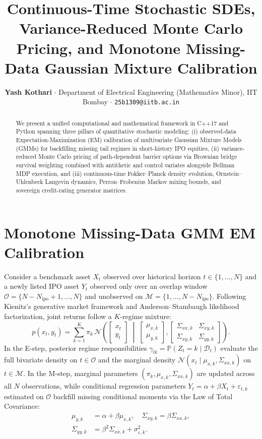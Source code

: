 \documentclass[10pt,twocolumn,a4paper]{article}
\title{\vspace{-1.4em}\large\textbf{Continuous-Time Stochastic SDEs, Variance-Reduced Monte Carlo Pricing, and Monotone Missing-Data Gaussian Mixture Calibration}\vspace{-0.5em}}
\author{\normalsize \textbf{Yash Kothari} $\cdot$ Department of Electrical Engineering (Mathematics Minor), IIT Bombay $\cdot$ \texttt{25b1309@iitb.ac.in}\vspace{-1.0em}}
\date{}
\begin{document}
\maketitle
\thispagestyle{empty}

\begin{abstract}
\noindent We present a unified computational and mathematical framework in C++17 and Python spanning three pillars of quantitative stochastic modeling: (i) observed-data Expectation-Maximization (EM) calibration of multivariate Gaussian Mixture Models (GMMs) for backfilling missing tail regimes in short-history IPO equities, (ii) variance-reduced Monte Carlo pricing of path-dependent barrier options via Brownian bridge survival weighting combined with antithetic and control variates alongside Bellman MDP execution, and (iii) continuous-time Fokker--Planck density evolution, Ornstein--Uhlenbeck Langevin dynamics, Perron--Frobenius Markov mixing bounds, and sovereign credit-rating generator matrices.
\end{abstract}

\section{Monotone Missing-Data GMM EM Calibration}
Consider a benchmark asset $X_t$ observed over historical horizon $t \in \{1, \dots, N\}$ and a newly listed IPO asset $Y_t$ observed only over an overlap window $\mathcal{O} = \{N - N_{\mathrm{ipo}} + 1, \dots, N\}$ and unobserved on $\mathcal{M} = \{1, \dots, N - N_{\mathrm{ipo}}\}$. Following Kienitz's generative market framework and Anderson--Stambaugh likelihood factorization, joint returns follow a $K$-regime mixture:
\begin{equation}
p(x_t, y_t) = \sum_{k=1}^K \pi_k \,\mathcal{N}\!\left(
\begin{bmatrix} x_t \\ y_t \end{bmatrix} \;\middle|\;
\begin{bmatrix} \mu_{x,k} \\ \mu_{y,k} \end{bmatrix},
\begin{bmatrix} \Sigma_{xx,k} & \Sigma_{xy,k} \\ \Sigma_{xy,k} & \Sigma_{yy,k} \end{bmatrix}
\right).
\end{equation}
In the E-step, posterior regime responsibilities $\gamma_{tk} = \mathbb{P}(Z_t = k \mid \mathcal{D}_t)$ evaluate the full bivariate density on $t \in \mathcal{O}$ and the marginal density $\mathcal{N}(x_t \mid \mu_{x,k}, \Sigma_{xx,k})$ on $t \in \mathcal{M}$. In the M-step, marginal parameters $(\pi_k, \mu_{x,k}, \Sigma_{xx,k})$ are updated across all $N$ observations, while conditional regression parameters $Y_t = \alpha + \beta X_t + \varepsilon_{t,k}$ estimated on $\mathcal{O}$ backfill missing conditional moments via the Law of Total Covariance:
\begin{align}
\mu_{y,k} &= \alpha + \beta \mu_{x,k}, \quad \Sigma_{xy,k} = \beta \Sigma_{xx,k}, \nonumber \\
\Sigma_{yy,k} &= \beta^2 \Sigma_{xx,k} + \sigma^2_{\varepsilon,k}.
\end{align}
\end{document}
